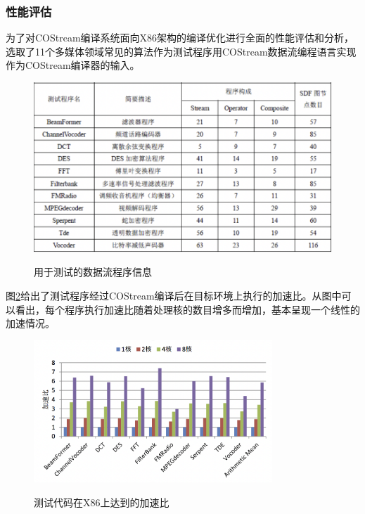 \subsubsection{性能评估}
为了对COStream编译系统面向X86架构的编译优化进行全面的性能评估和分析，选取了11个多媒体领域常见的算法作为测试程序用COStream数据流编程语言实现作为COStream编译器的输入。
\begin{figure}[htbp]
  \centering
  \includegraphics[width=1.0\textwidth]{Img/Chap_Application/Yu/x86benchmark.png}\\
  \caption{用于测试的数据流程序信息}\label{fig:x86benchmark}
\end{figure}

图\ref{fig:x86ratio}给出了测试程序经过COStream编译后在目标环境上执行的加速比。从图中可以看出，每个程序执行加速比随着处理核的数目增多而增加，基本呈现一个线性的加速情况。
\begin{figure}[htbp]
  \centering
  \includegraphics[width=0.8\textwidth]{Img/Chap_Application/Yu/x86ratio.png}\\
  \caption{测试代码在X86上达到的加速比}\label{fig:x86ratio}
\end{figure}

